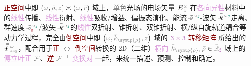 \textcolor{Maroon}{正空间}中即 $\left( \mathcolor{gray}{\omega}, \mathcolor{gray}{\bar{\rho}}, \mathcolor{gray}{z} \right) \asymp \left( \mathcolor{gray}{\omega}, \mathcolor{gray}{\bar{r}} \right)$ 域上，\textcolor{gray}{单色}光场的电场矢量 $\bar{E}^{\;\!\mathcolor{gray}{\omega}}_{\;\!\mathcolor{gray}{z}}$ 在\textcolor{Plum}{各向异性}材料中的\textcolor{Plum}{线性}\textcolor{NavyBlue}{传播}、\textcolor{Plum}{线性}\textcolor{NavyBlue}{衍射}、\textcolor{Plum}{线性}\textcolor{NavyBlue}{吸收}/\textcolor{NavyBlue}{增益}、偏振态演化、\textcolor{PineGreen}{能流}$\Xint{\begin{smallmatrix} ~ \\ {}^{}_{\mathcolor{gray}{-}} \\ ~ \end{smallmatrix}}{20}{\bar{s}}^{\;\! \mathcolor{gray}{\omega} \textcolor{PineGreen}{\jmath}}$-\textcolor{PineGreen}{波矢}$\Xint{\begin{smallmatrix} ~ \\ {}^{}_{\mathcolor{gray}{-}} \\ ~ \end{smallmatrix}}{15}{\bar{k}}^{\;\! \mathcolor{gray}{\omega} \textcolor{PineGreen}{\jmath}}$走离、\textcolor{PineGreen}{群速度}$\Xint{\begin{smallmatrix} ~ \\ {}^{}_{\mathcolor{gray}{-}} \\ ~ \end{smallmatrix}}{20}{\bar{v}}^{\;\! \mathcolor{gray}{\omega} \textcolor{PineGreen}{\jmath}}_{\textcolor{Maroon}{\text{g}}}$/\textcolor{PineGreen}{波矢}$\Xint{\begin{smallmatrix} ~ \\ {}^{}_{\mathcolor{gray}{-}} \\ ~ \end{smallmatrix}}{15}{\bar{k}}^{\;\! \mathcolor{gray}{\omega} \textcolor{PineGreen}{\jmath}}$的\textcolor{Plum}{线性}\textcolor{PineGreen}{双折射}、\textcolor{PineGreen}{锥折射}、\textcolor{PineGreen}{双锥折射}、横/纵\textcolor{NavyBlue}{自旋轨道耦合}等动力学过程，完全由\textcolor{Maroon}{倒空间}中即 $\left( \mathcolor{gray}{\omega}, \mathcolor{gray}{\bar{k}_{\symup{\rho}}}, \mathcolor{gray}{z} \right)$ 域的 $\textcolor{Plum}{3 \times 3}$ \textcolor{Maroon}{转移矩阵}  所给出的 $\Xint{\mathcolor{gray}{-}}{30}{\bar{\bar{T}}}^{\;\!\mathcolor{gray}{\omega}}_{\;\! \mathcolor{gray}{z} \mathcolor{gray}{z_0}}$，配合用于\textcolor{Maroon}{正} $\longleftrightarrow$ \textcolor{Maroon}{倒空间}转换的 2D（二维）\textcolor{Plum}{横向} $\mathcolor{gray}{\bar{k}_{\symup{\rho}}}, \mathcolor{gray}{\bar{\rho}} \in \mathcolor{gray}{\bar{\mathbb{R}}_{\textcolor{Plum}{2}}}$ 域上的 \textcolor{Plum}{傅立叶正} $\mathcolor{gray}{\mathcal F}$、\textcolor{Maroon}{逆} $\mathcolor{gray}{\mathcal F^{-1}}$ \textcolor{Plum}{变换对}  一起，来统一描述、预测、控制和确定。

